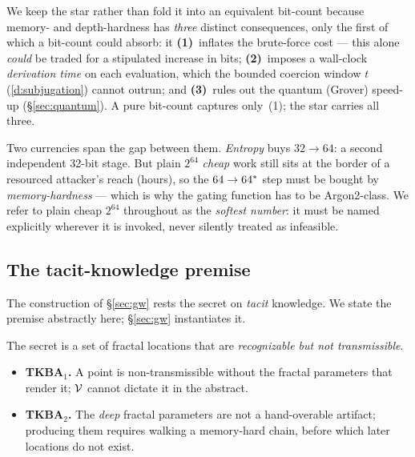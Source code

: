 \noindent We keep the star rather than fold it into an equivalent bit-count because
memory- and depth-hardness has \emph{three} distinct consequences, only the first of
which a bit-count could absorb: it \textbf{(1)}~inflates the brute-force cost --- this
alone \emph{could} be traded for a stipulated increase in bits; \textbf{(2)}~imposes a
wall-clock \emph{derivation time} on each evaluation, which the bounded coercion
window $t$ (\ref{d:subjugation}) cannot outrun; and \textbf{(3)}~rules out the quantum
(Grover) speed-up (\S\ref{sec:quantum}). A pure bit-count captures only~(1); the star
carries all three.

Two currencies span the gap between them. \emph{Entropy} buys $32 \to 64$: a
second independent 32-bit stage. But plain $2^{64}$ \emph{cheap} work still sits
at the border of a resourced attacker's reach (hours), so the $64 \to 64^{*}$
step must be bought by \emph{memory-hardness} --- which is why the gating
function has to be Argon2-class. We refer to plain cheap $2^{64}$ throughout as
the \emph{softest number}: it must be named explicitly wherever it is invoked,
never silently treated as infeasible.

\subsection{The tacit-knowledge premise}

The construction of \S\ref{sec:gw} rests the secret on \emph{tacit} knowledge.
We state the premise abstractly here; \S\ref{sec:gw} instantiates it.

\begin{assumption}\label{ass:tkba}
The secret is a set of fractal locations that are \emph{recognizable but not
transmissible}.
\begin{itemize}[nosep,leftmargin=1.4em]
  \item \textbf{TKBA$_1$.} A point is non-transmissible without the fractal
        parameters that render it; $\mathcal{V}$ cannot dictate it in the abstract.
  \item \textbf{TKBA$_2$.} The \emph{deep} fractal parameters are not a
        hand-overable artifact; producing them requires walking a memory-hard
        chain, before which later locations do not exist.
\end{itemize}
\end{assumption}

